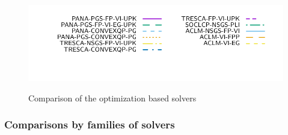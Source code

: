 \begin{frame}
\begin{figure}
{\includegraphics[height=\legendheight]{figure/OPTI/1.0e-08/50/time/profile-Chain_legend.pdf}}
 \caption{Comparison of the optimization based solvers}
  \label{fig:OPTI}
\end{figure}

\end{frame}

\begin{frame}
  \frametitle{Comparisons by families of solvers}
  \begin{center}
    \begin{figure}
      \centering
      \subfiglayout
       \\

\end{figure}
\end{center}
\end{frame}
